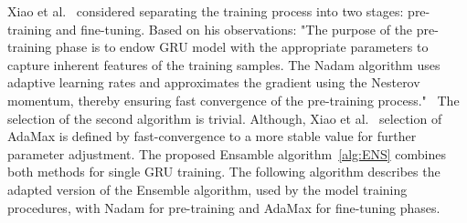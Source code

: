 %
%
Xiao et al.~\cite{xiao_accurate_2019} considered separating the training process into two stages: pre-training and fine-tuning.
Based on his observations: "The purpose of the pre-training phase is to endow GRU model with the appropriate parameters to capture inherent features of the training samples.
The Nadam algorithm uses adaptive learning rates and approximates the gradient using the Nesterov momentum, thereby ensuring fast convergence of the pre-training process."~\cite{xiao_accurate_2019}
The selection of the second algorithm is trivial.
Although, Xiao et al.~\cite{xiao_accurate_2019} selection of AdaMax is defined by fast-convergence to a more stable value for further parameter adjustment.
The proposed Ensamble algorithm~\ref{alg:ENS} combines both methods for single GRU training.
The following algorithm describes the adapted version of the Ensemble algorithm, used by the model training procedures, with Nadam for pre-training and AdaMax for fine-tuning phases.

